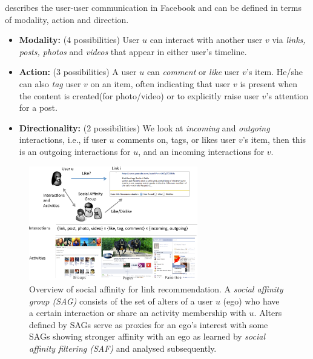  describes the user-user communication in Facebook and can be defined in terms of modality, action and direction.
\begin{itemize}
\item \textbf{Modality:} (4 possibilities)
User $u$ can interact with another user $v$ via \textit{links, posts, photos} and \textit{videos} that appear in either user's timeline.

\item \textbf{Action:} (3 possibilities)
A user $u$ can \textit{comment} or \textit{like} 
user $v$'s item. He/she can also \textit{tag} user $v$ on an 
item, often indicating that user $v$ is present when the content is created(for photo/video)
or to explicitly raise user $v$'s attention for a post.

\item \textbf{Directionality:} (2 possibilities)
We look at \textit{incoming} and \textit{outgoing} interactions, i.e.,
if user $u$ comments on, tags, or likes user $v$'s item,
then this is an outgoing interactions for $u$, and an incoming interactions for $v$.
      								
\end{itemize}

\begin{figure}[t!]
\centering
\includegraphics[width=1\linewidth,height=50mm]{data/overview}
\caption{Overview of social affinity for link recommendation.
A \emph{social affinity group (SAG)} consists of the set of alters 
of a user $u$ (ego) who have a
certain interaction or share an activity membership with $u$.
Alters defined by SAGs serve as proxies for an ego's interest with some
SAGs showing stronger affinity with an ego as learned by \emph{social affinity filtering (SAF)}
and analysed subsequently.}
\label{fig:overview}
\end{figure}

